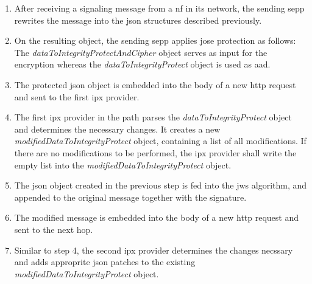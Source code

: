 \begin{enumerate}[wide, labelwidth=!, labelindent=0pt]
    \item After receiving a signaling message from a \gls{nf} in its network, the sending \gls{sepp} rewrites the message into the \gls{json} structures described previously.
    \item On the resulting object, the sending \gls{sepp} applies \gls{jose} protection as follows: The \textit{dataToIntegrityProtectAndCipher} object serves as input for the encryption whereas the \textit{dataToIntegrityProtect} object is used as \gls{aad}.
    \item The protected \gls{json} object is embedded into the body of a new \gls{http} request and sent to the first \gls{ipx} provider.
    \item The first \gls{ipx} provider in the path parses the \textit{dataToIntegrityProtect} object and determines the necessary changes. It creates a new \textit{modifiedDataToIntegrityProtect} object, containing a list of all modifications. If there are no modifications to be performed, the \gls{ipx} provider shall write the empty list into the \textit{modifiedDataToIntegrityProtect} object.
    \item The \gls{json} object created in the previous step is fed into the \gls{jws} algorithm, and appended to the original message together with the signature.
    \item The modified message is embedded into the body of a new \gls{http} request and sent to the next hop.
    \item Similar to step 4, the second \gls{ipx} provider determines the changes necssary and adds approprite \gls{json} patches to the existing \textit{modifiedDataToIntegrityProtect} object.

\end{enumerate}
